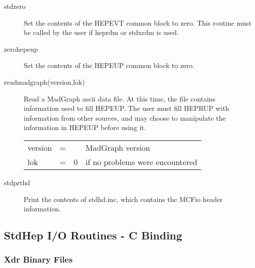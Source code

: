 \begin{description}

\item[stdzero]
 Set the contents of the HEPEVT common block to zero.
 This routine must be called by the user if heprdm or stdxrdm is used.

\item[zerohepeup]
 Set the contents of the HEPEUP common block to zero.

\item[readmadgraph(version,lok)]
 Read a MadGraph ascii data file.  
 At this time, the file contains information used to fill HEPEUP. 
 The user must fill HEPRUP with information from other sources, 
 and may choose to manipulate the information in HEPEUP before using it.

\begin{tabular}{lcll}
version & = &  & MadGraph version \\
lok  & = & 0  & if no problems were encountered \\
\end{tabular}

\item[stdprthd]
 Print the contents of stdhd.inc, which contains the MCFio header information.

\end{description}

\subsection{StdHep I/O Routines - C Binding}

\subsubsection{Xdr Binary Files}

